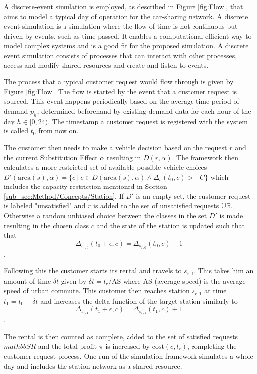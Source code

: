 A discrete-event simulation is employed, as described in Figure \ref{fig:Flow}, that aims to model a typical day of operation
for the car-sharing network. A discrete event simulation is a simulation where the flow of time is not continuous but driven
by events, such as time passed. It enables a computational efficient way to model complex systems and is a good fit for the
proposed simulation. A discrete event simulation consists of processes that can interact with other processes, access and modify
shared resources and create and listen to events.

The process that a typical customer request would flow through is given by Figure \ref{fig:Flow}. The flow is started by the
event that a customer request is sourced. This event happens periodically based on the average time period of demand $p_h$, determined
beforehand by existing demand data for each hour of the day $h \in [0,24)$. The timestamp a customer request is registered with the system
is called $t_0$ from now on.

The customer then needs to make a vehicle decision based on the request $r$ and the current Substitution Effect
 $\alpha$ resulting in $D(r, \alpha)$. The framework then calculates a more restricted set of available
possible vehicle choices $D'(\text{area}(s), \alpha) = \{c \ |\ c \in D(\text{area}(s), \alpha) \land \Delta_s(t_0, c) > -C\}$ which
includes the capacity restriction mentioned in Section \ref{sub_sec:Method/Concepts/Station}. If $D'$ is an empty set, the customer
request is labeled "unsatisfied" and $r$ is added to the set of unsatisfied requests $\mathbb{UR}$. Otherwise a random unbiased choice between the classes in 
the set $D'$ is made resulting in the chosen class $c$ and the state of the station is updated such that that 
$$
\Delta_{s_{r, 0}}(t_0 + \epsilon, c) = \Delta_{s_{r, 0}}(t_0, c) - 1
$$.
 
Following this the customer starts its rental and travels to $s_{r, 1}$. This takes him an amount of time $\delta t$ given by 
$\delta t = l_r / \text{AS}$ where AS (average speed) is the average speed of urban commute. This customer then reaches
station $s_{r, 1}$ at time $t_1 = t_0 + \delta t$ and increases the delta function of the target station similarly to
$$
\Delta_{s_{r, 1}}(t_1 + \epsilon, c) = \Delta_{s_{r, 1}}(t_1, c) + 1
$$.

The rental is then counted as complete, added to the set of satisfied requests $mathbb{SR}$ and the total profit $\pi$ is increased by $\text{cost}(c, l_r)$, completing the
customer request process. One run of the simulation framework simulates a whole day and includes the station network
as a shared resource.


